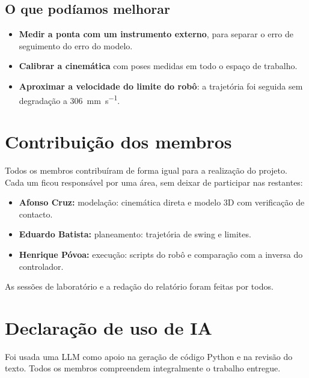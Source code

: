 \subsection*{\textcolor{azul}{O que podíamos melhorar}}

\begin{itemize}[itemsep=2pt]
  \item \textbf{Medir a ponta com um instrumento externo}, para separar o
        erro de seguimento do erro do modelo.
  \item \textbf{Calibrar a cinemática} com poses medidas em todo o espaço de
        trabalho.
  \item \textbf{Aproximar a velocidade do limite do robô}: a trajetória foi
        seguida sem degradação a \SI{306}{\milli\meter\per\second}.
\end{itemize}


\section*{Contribuição dos membros}
Todos os membros contribuíram de forma igual para a realização do projeto.
Cada um ficou responsável por uma área, sem deixar de participar nas restantes:
\begin{itemize}
  \item \textbf{Afonso Cruz:} modelação: cinemática direta e modelo 3D com
        verificação de contacto.
  \item \textbf{Eduardo Batista:} planeamento: trajetória de swing e limites.
  \item \textbf{Henrique Póvoa:} execução: scripts do robô e comparação com a
        inversa do controlador.
\end{itemize}
As sessões de laboratório e a redação do relatório foram feitas por todos.

\section*{Declaração de uso de IA}
Foi usada uma LLM como apoio na geração de código Python e
na revisão do texto. Todos os membros compreendem integralmente o trabalho
entregue.
